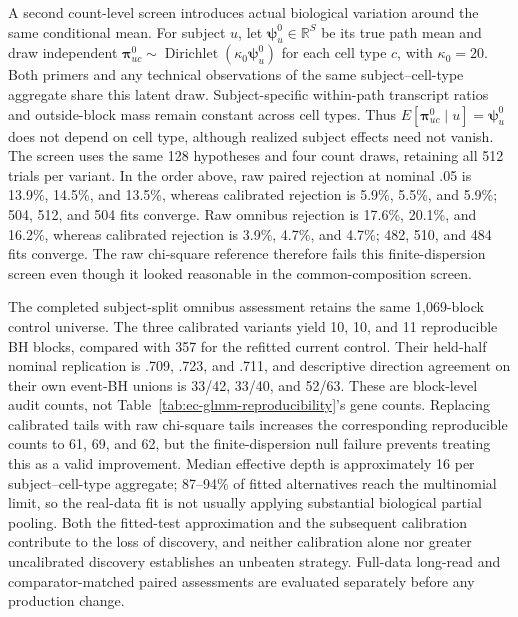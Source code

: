 \documentclass[11pt]{article}
\begin{document}
A second count-level screen introduces actual biological variation around the same conditional mean. For subject \(u\), let \(\boldsymbol\psi_u^0\in\mathbb R^S\) be its true path mean and draw independent \(\boldsymbol\pi_{uc}^0\sim\operatorname{Dirichlet}(\kappa_0\boldsymbol\psi_u^0)\) for each cell type \(c\), with \(\kappa_0=20\). Both primers and any technical observations of the same subject--cell-type aggregate share this latent draw. Subject-specific within-path transcript ratios and outside-block mass remain constant across cell types. Thus \(E[\boldsymbol\pi_{uc}^0\mid u]=\boldsymbol\psi_u^0\) does not depend on cell type, although realized subject effects need not vanish. The screen uses the same 128 hypotheses and four count draws, retaining all 512 trials per variant. In the order above, raw paired rejection at nominal .05 is 13.9\%, 14.5\%, and 13.5\%, whereas calibrated rejection is 5.9\%, 5.5\%, and 5.9\%; 504, 512, and 504 fits converge. Raw omnibus rejection is 17.6\%, 20.1\%, and 16.2\%, whereas calibrated rejection is 3.9\%, 4.7\%, and 4.7\%; 482, 510, and 484 fits converge. The raw chi-square reference therefore fails this finite-dispersion screen even though it looked reasonable in the common-composition screen.

The completed subject-split omnibus assessment retains the same 1,069-block control universe. The three calibrated variants yield 10, 10, and 11 reproducible BH blocks, compared with 357 for the refitted current control. Their held-half nominal replication is .709, .723, and .711, and descriptive direction agreement on their own event-BH unions is 33/42, 33/40, and 52/63. These are block-level audit counts, not Table~\ref{tab:ec-glmm-reproducibility}'s gene counts. Replacing calibrated tails with raw chi-square tails increases the corresponding reproducible counts to 61, 69, and 62, but the finite-dispersion null failure prevents treating this as a valid improvement. Median effective depth is approximately 16 per subject--cell-type aggregate; 87--94\% of fitted alternatives reach the multinomial limit, so the real-data fit is not usually applying substantial biological partial pooling. Both the fitted-test approximation and the subsequent calibration contribute to the loss of discovery, and neither calibration alone nor greater uncalibrated discovery establishes an unbeaten strategy. Full-data long-read and comparator-matched paired assessments are evaluated separately before any production change.
\end{document}

